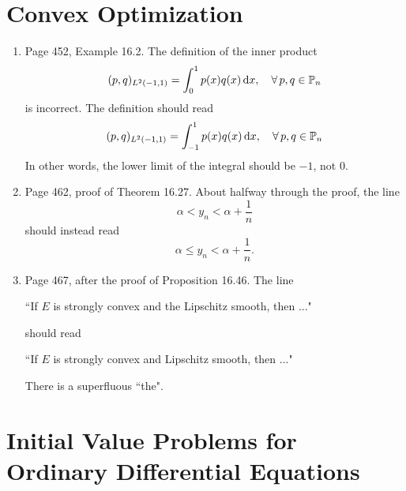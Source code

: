 \documentclass{book}
\begin{document}
	\chapter{Convex Optimization}
	
	\begin{enumerate}
	\item
Page 452, Example 16.2. The definition of the inner product
	\[
(p,q)_{L^2(-1,1)} = \int_{0}^1p(x)q(x)\, \textup{d} x, \quad \forall \, p,q\in{\mathbb P}_n
	\]
is incorrect. The definition should read
	\[
(p,q)_{L^2(-1,1)} = \int_{-1}^1p(x)q(x)\, \textup{d} x, \quad \forall \, p,q\in{\mathbb P}_n
	\]
In other words, the lower limit of the integral should be $-1$, not 0.

	\item
 Page 462, proof of Theorem 16.27. About halfway through the proof, the line
 	\[
 \alpha < y_n < \alpha+\frac{1}{n}	
 	\]
 should instead read
 	\[
 \alpha \le  y_n < \alpha+\frac{1}{n}.	
 	\]
 	
 	\item
 Page 467, after the proof of Proposition 16.46. The line
 	
 \hspace{0.25in}``If $E$ is strongly convex and the Lipschitz smooth, then ..."
 
 should read
 	
 \hspace{0.25in}``If $E$ is strongly convex and Lipschitz smooth, then ..."
 
 There is a superfluous ``the".
 
	\end{enumerate}
	
\chapter{Initial Value Problems for Ordinary Differential Equations}
\end{document}
